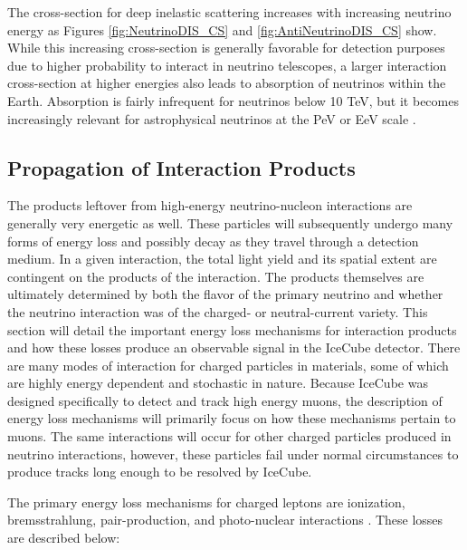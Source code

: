 \documentclass{gatech-thesis}
\begin{document}
The cross-section for deep inelastic scattering increases with increasing neutrino energy as Figures \ref{fig:NeutrinoDIS_CS} and \ref{fig:AntiNeutrinoDIS_CS} show. While this increasing cross-section is generally favorable for detection purposes due to higher probability to interact in neutrino telescopes, a larger interaction cross-section at higher energies also leads to absorption of neutrinos within the Earth. Absorption is fairly infrequent for neutrinos below 10 TeV, but it becomes increasingly relevant for astrophysical neutrinos at the PeV or EeV scale \cite{2013arXiv1304.4891K}.

\subsection{Propagation of Interaction Products}
The products leftover from high-energy neutrino-nucleon interactions are generally very energetic as well. These particles will subsequently undergo many forms of energy loss and possibly decay as they travel through a detection medium. In a given interaction, the total light yield and its spatial extent are contingent on the products of the interaction. The products themselves are ultimately determined by both the flavor of the primary neutrino and whether the neutrino interaction was of the charged- or neutral-current variety. This section will detail the important energy loss mechanisms for interaction products and how these losses produce an observable signal in the IceCube detector. There are many modes of interaction for charged particles in materials, some of which are highly energy dependent and stochastic in nature. Because IceCube was designed specifically to detect and track high energy muons, the description of energy loss mechanisms will primarily focus on how these mechanisms pertain to muons. The same interactions will occur for other charged particles produced in neutrino interactions, however, these particles fail under normal circumstances to produce tracks long enough to be resolved by IceCube.

The primary energy loss mechanisms for charged leptons are ionization, bremsstrahlung, pair-production, and photo-nuclear interactions \cite{2001PhRvD..63i4020I}. These losses are described below:
\end{document}

